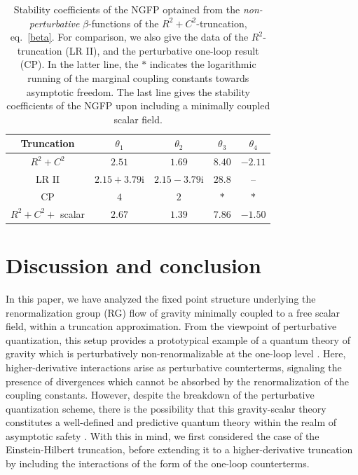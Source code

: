\documentclass[preprint,preprintnumbers,amsmath,amssymb,nofootinbib,APS]{revtex4}
\newcommand{\2}{\sqrt{2\,}}
\newcommand{\I}{\mathrm{i}}
\begin{document}
\begin{table}[t!]
\begin{center}
\begin{tabular}{|c||c|c|c|c|} \hline
Truncation & $\theta_1$ & $\theta_2$ & $\theta_3$ & $\theta_4$  \\ \hline
$R^2 + C^2$ &  $2.51$ & $1.69$ & $8.40$ & \; \;  $-2.11$ \; \;  \\
LR II & \; \; $2.15 + 3.79 \I$ \; \; & \; \; $2.15 - 3.79 \I$ \; \;& \; \; $28.8$ \; \; & \; \; -- \; \;  \\
CP &  $4$ &$2$ & $*$ & $*$      \\ \hline \hline
\; $R^2 + C^2 + $ scalar \; & $2.67$ & $1.39$ & $7.86$ & $-1.50$ \\ \hline
\end{tabular}
\parbox[c]{\textwidth}{\caption{\label{t.Stab}{Stability coefficients of the NGFP optained from the {\it non-perturbative} $\beta$-functions of the $R^2 + C^2$-truncation, eq.\ \eqref{beta}. For comparison, we also give the data of the $R^2$-truncation \cite{Lauscher:2002mb} (LR II), and the perturbative one-loop result \cite{Codello:2006in} (CP). In the latter line, the $*$ indicates the logarithmic running of the marginal coupling constants towards asymptotic freedom. The last line gives the stability coefficients of the NGFP upon including a minimally coupled scalar field.}}}
\end{center}
\end{table}



\section{Discussion and conclusion}
\label{sec:end}
In this paper, we have analyzed the fixed point structure underlying the renormalization group (RG) flow of gravity minimally coupled to a free scalar field, within a truncation approximation. From the viewpoint of perturbative quantization, this setup provides a prototypical example of a quantum theory of gravity which is perturbatively non-renormalizable at the one-loop level \cite{'tHooft:1974bx}. Here, higher-derivative interactions arise as perturbative counter\-terms, signaling the presence of divergences which cannot be absorbed by the renormalization of the coupling constants.  However,
despite the breakdown of the perturbative quantization scheme, there is the possibility that this gravity-scalar theory constitutes a well-defined and predictive quantum theory within the realm of asymptotic safety \cite{Percacci:2002ie,Percacci:2003jz}. With this in mind, we first considered the case of the Einstein-Hilbert truncation, before extending it to a higher-derivative truncation by including the interactions of the form of the one-loop counterterms. 
\end{document}
